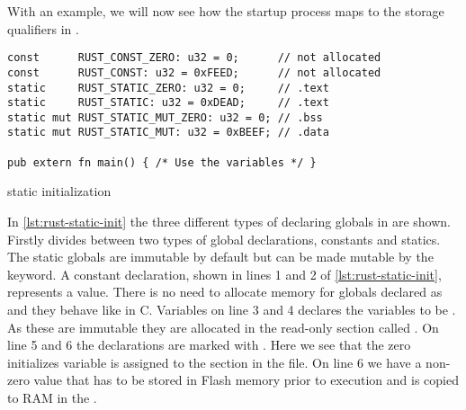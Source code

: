 With an example, we will now see how the startup process maps to the storage qualifiers in {\rust}.
\begin{listing}[H]
\begin{verbatim}
const      RUST_CONST_ZERO: u32 = 0;      // not allocated
const      RUST_CONST: u32 = 0xFEED;      // not allocated
static     RUST_STATIC_ZERO: u32 = 0;     // .text
static     RUST_STATIC: u32 = 0xDEAD;     // .text
static mut RUST_STATIC_MUT_ZERO: u32 = 0; // .bss
static mut RUST_STATIC_MUT: u32 = 0xBEEF; // .data

pub extern fn main() { /* Use the variables */ }
\end{verbatim}
\caption{\rust static initialization}
\label{lst:rust-static-init}
\end{listing}
In \autoref{lst:rust-static-init} the three different types of declaring globals in {\rust} are shown.
Firstly {\rust} divides between two types of global declarations, constants and statics.
The static globals are immutable by default but can be made mutable by the  keyword.
A constant declaration, shown in lines 1 and 2 of \autoref{lst:rust-static-init}, represents a value.
There is no need to allocate memory for globals declared as  and they behave like  in C. 
Variables on line 3 and 4 declares the variables to be .
As these are immutable they are allocated in the read-only section called .
On line 5 and 6 the declarations are marked with .
Here we see that the zero initializes variable is assigned to the  section in the \elf file.
On line 6 we have a non-zero value that has to be stored in Flash memory prior to execution and is copied to RAM in the .
